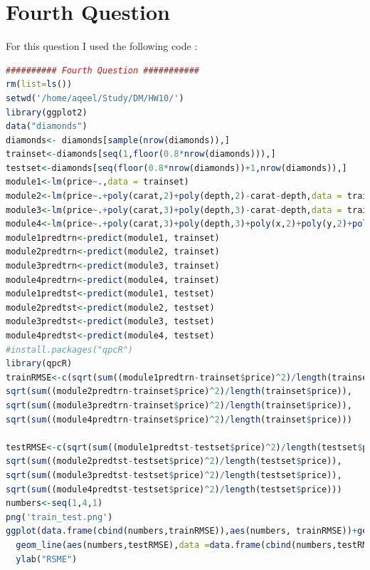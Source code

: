 \documentclass{article}
\begin{document}
\section*{Fourth Question}
For this question I used the following code : 
\begin{lstlisting}[language=R]
########## Fourth Question ###########
rm(list=ls())
setwd('/home/aqeel/Study/DM/HW10/')
library(ggplot2)
data("diamonds")
diamonds<- diamonds[sample(nrow(diamonds)),]
trainset<-diamonds[seq(1,floor(0.8*nrow(diamonds))),]
testset<-diamonds[seq(floor(0.8*nrow(diamonds))+1,nrow(diamonds)),]
module1<-lm(price~.,data = trainset)
module2<-lm(price~.+poly(carat,2)+poly(depth,2)-carat-depth,data = trainset)
module3<-lm(price~.+poly(carat,3)+poly(depth,3)-carat-depth,data = trainset)
module4<-lm(price~.+poly(carat,3)+poly(depth,3)+poly(x,2)+poly(y,2)+poly(z,2)-carat-depth-x-y-z,data = trainset)
module1predtrn<-predict(module1, trainset)
module2predtrn<-predict(module2, trainset)
module3predtrn<-predict(module3, trainset)
module4predtrn<-predict(module4, trainset)
module1predtst<-predict(module1, testset)
module2predtst<-predict(module2, testset)
module3predtst<-predict(module3, testset)
module4predtst<-predict(module4, testset)
#install.packages("qpcR")
library(qpcR)
trainRMSE<-c(sqrt(sum((module1predtrn-trainset$price)^2)/length(trainset$price)),
sqrt(sum((module2predtrn-trainset$price)^2)/length(trainset$price)),
sqrt(sum((module3predtrn-trainset$price)^2)/length(trainset$price)),
sqrt(sum((module4predtrn-trainset$price)^2)/length(trainset$price)))

testRMSE<-c(sqrt(sum((module1predtst-testset$price)^2)/length(testset$price)),
sqrt(sum((module2predtst-testset$price)^2)/length(testset$price)),
sqrt(sum((module3predtst-testset$price)^2)/length(testset$price)),
sqrt(sum((module4predtst-testset$price)^2)/length(testset$price)))
numbers<-seq(1,4,1)
png('train_test.png')
ggplot(data.frame(cbind(numbers,trainRMSE)),aes(numbers, trainRMSE))+geom_line(col="red") +
  geom_line(aes(numbers,testRMSE),data =data.frame(cbind(numbers,testRMSE)),col="blue" )+ xlab("Module")+
  ylab("RSME")
\end{lstlisting}
\end{document}
